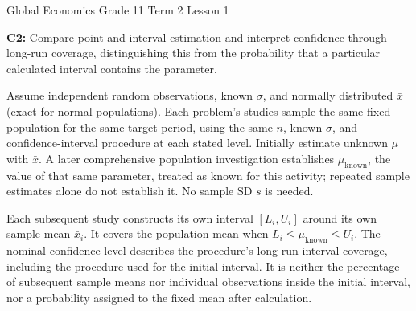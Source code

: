 {
Global Economics \textbar{} Grade 11 \textbar{} Term 2 \textbar{} Lesson 1\par}
\textbf{C2:} Compare point and interval estimation and interpret confidence through long-run coverage, distinguishing this from the probability that a particular calculated interval contains the parameter.

Assume independent random observations, known $\sigma$, and normally distributed $\bar{x}$ (exact for normal populations). Each problem's studies sample the same fixed population for the same target period, using the same $n$, known $\sigma$, and confidence-interval procedure at each stated level. Initially estimate unknown $\mu$ with $\bar{x}$. A later comprehensive population investigation establishes $\mu_{\mathrm{known}}$, the value of that same parameter, treated as known for this activity; repeated sample estimates alone do not establish it. No sample SD $s$ is needed.

Each subsequent study constructs its own interval $[L_i,U_i]$ around its own sample mean $\bar{x}_i$. It covers the population mean when $L_i\leq\mu_{\mathrm{known}}\leq U_i$. The nominal confidence level describes the procedure's long-run interval coverage, including the procedure used for the initial interval. It is neither the percentage of subsequent sample means nor individual observations inside the initial interval, nor a probability assigned to the fixed mean after calculation.

